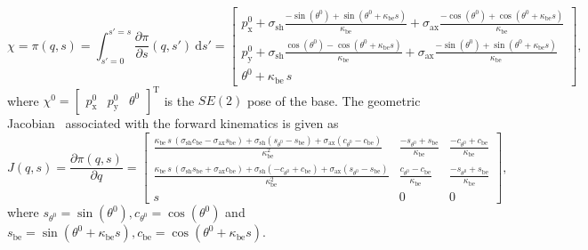 \begin{equation}\label{eq:background:kinematics:planar_constant_strain:forward_kinematics}
    \chi = \pi(q,s) = \int_{s'=0}^{s'=s} \frac{\partial \pi}{\partial s}(q,s') \: \mathrm{d}s' = \begin{bmatrix}
        p_\mathrm{x}^0 + \sigma_\mathrm{sh} \frac{-\sin(\theta^0) + \sin(\theta^0 + \kappa_\mathrm{be} s)}{\kappa_\mathrm{be}} + \sigma_\mathrm{ax} \frac{-\cos(\theta^0) + \cos(\theta^0 + \kappa_\mathrm{be} s)}{\kappa_\mathrm{be}}\\
        p_\mathrm{y}^0 + \sigma_\mathrm{sh} \frac{\cos(\theta^0) - \cos(\theta^0 + \kappa_\mathrm{be} s)}{\kappa_\mathrm{be}} + \sigma_\mathrm{ax} \frac{-\sin(\theta^0)+\sin(\theta^0 + \kappa_\mathrm{be} s)}{\kappa_\mathrm{be}}\\
        \theta^0 + \kappa_\mathrm{be} \, s
    \end{bmatrix},
\end{equation}
where $\chi^0 = \begin{bmatrix}
    p_\mathrm{x}^0 & p_\mathrm{y}^0 & \theta^0
\end{bmatrix}^\mathrm{T}$ is the $SE(2)$ pose of the base.
The geometric Jacobian~\citep{siciliano2010robotics} associated with the forward kinematics is given as
\begin{equation}
    J(q,s) = \frac{\partial \pi(q,s)}{\partial q} = \begin{bmatrix}
        \frac{\kappa_\mathrm{be} \, s \, \left ( \sigma_\mathrm{sh} c_\mathrm{be} - \sigma_\mathrm{ax} s_\mathrm{be} \right ) + \sigma_\mathrm{sh} \left ( s_{\theta^0} - s_\mathrm{be} \right ) + \sigma_\mathrm{ax} \left ( c_{\theta^0} - c_\mathrm{be} \right )}{\kappa_\mathrm{be}^2}
        & \frac{-s_{\theta^0} + s_\mathrm{be}}{\kappa_\mathrm{be}}
        & \frac{-c_{\theta^0} + c_\mathrm{be}}{\kappa_\mathrm{be}}
        \\
        \frac{\kappa_\mathrm{be} \, s \, \left ( \sigma_\mathrm{sh} s_\mathrm{be} + \sigma_\mathrm{ax} c_\mathrm{be} \right ) + \sigma_\mathrm{sh} \left ( -c_{\theta^0} + c_\mathrm{be} \right ) + \sigma_\mathrm{ax} \left ( s_{\theta^0} - s_\mathrm{be} \right )}{\kappa_\mathrm{be}^2}
        & \frac{c_{\theta^0} - c_\mathrm{be}}{\kappa_\mathrm{be}}
        & \frac{-s_{\theta^0} + s_\mathrm{be}}{\kappa_\mathrm{be}}
        \\
        s & 0 & 0
    \end{bmatrix},
\end{equation}
where $s_{\theta^0} = \sin(\theta^0), c_{\theta^0} = \cos(\theta^0)$ and $s_\mathrm{be} = \sin(\theta^0+\kappa_\mathrm{be} s), c_\mathrm{be} = \cos(\theta^0+\kappa_\mathrm{be} s)$.
